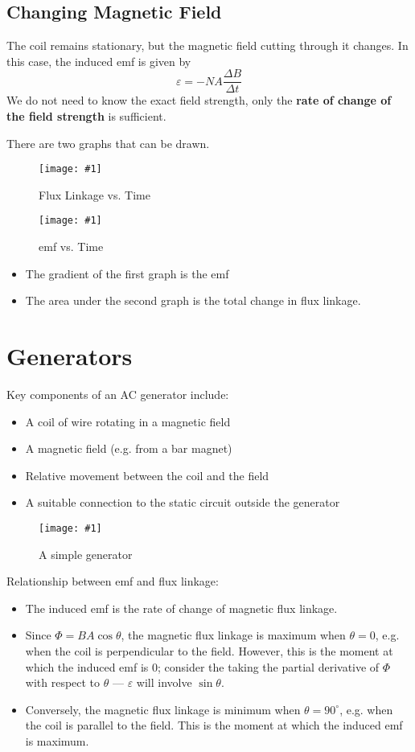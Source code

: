 \documentclass[a4paper,12pt]{article}
\let\oldsection\section
\renewcommand\section{\clearpage\oldsection}
\newcommand{\degsym}{^{\circ}}
\newcommand{\img}[4]{\begin{center}
  \begin{figure}[H]
    \centering
    \texttt{[image: \#1]}
    \caption{#3}
    \label{fig:#4}
  \end{figure}
\end{center}}
\begin{document}
\pagebreak

\subsection{Changing Magnetic Field}

The coil remains stationary, but the magnetic field cutting through it changes. In this case, the induced emf is given by $$\varepsilon = -NA\frac{\Delta B}{\Delta t}$$We do not need to know the exact field strength, only the \textbf{rate of change of the field strength} is sufficient.

There are two graphs that can be drawn.

\begin{minipage}{0.5\textwidth}
  \img{g1.png}{1}{Flux Linkage vs. Time}{g1}
\end{minipage}\begin{minipage}{0.5\textwidth}
  \img{g2.png}{1}{emf vs. Time}{g1}
\end{minipage}

\begin{itemize}
  \item The gradient of the first graph is the emf
  \item The area under the second graph is the total change in flux linkage.
\end{itemize}


\section{Generators}
Key components of an AC generator include:
\begin{itemize}
  \item A coil of wire rotating in a magnetic field
  \item A magnetic field (e.g. from a bar magnet)
  \item Relative movement between the coil and the field
  \item A suitable connection to the static circuit outside the generator
\end{itemize}

\img{generator.jpg}{1}{A simple generator}{generator}

Relationship between emf and flux linkage:

\begin{itemize}
  \item The induced emf is the rate of change of magnetic flux linkage.
  \item Since $\Phi = BA\cos\theta$, the magnetic flux linkage is maximum when $\theta = 0$, e.g. when the coil is perpendicular to the field. However, this is the moment at which the induced emf is 0; consider the taking the partial derivative of $\Phi$ with respect to $\theta$ --- $\varepsilon$ will involve $\sin\theta$.
  \item Conversely, the magnetic flux linkage is minimum when $\theta = 90\degsym$, e.g. when the coil is parallel to the field. This is the moment at which the induced emf is maximum.

\end{itemize}
\end{document}
